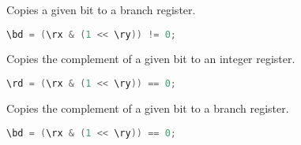 Copies a given bit to a branch register.

\begin{lstlisting}[numbers=none, basicstyle=\ttfamily\footnotesize, language=C++]
\bd = (\rx & (1 << \ry)) != 0;
\end{lstlisting}

Copies the complement of a given bit to an integer register.

\begin{lstlisting}[numbers=none, basicstyle=\ttfamily\footnotesize, language=C++]
\rd = (\rx & (1 << \ry)) == 0;
\end{lstlisting}

Copies the complement of a given bit to a branch register.

\begin{lstlisting}[numbers=none, basicstyle=\ttfamily\footnotesize, language=C++]
\bd = (\rx & (1 << \ry)) == 0;
\end{lstlisting}
